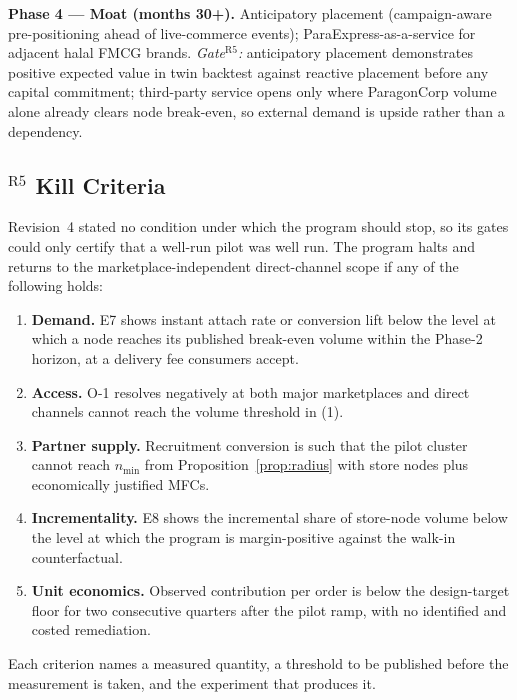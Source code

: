 \textbf{Phase 4 --- Moat (months 30+).} Anticipatory placement (campaign-aware pre-positioning ahead of live-commerce events); ParaExpress-as-a-service for adjacent halal FMCG brands.
\emph{Gate}$^{\mathrm{R5}}$\emph{:} anticipatory placement demonstrates positive expected value in twin backtest against reactive placement before any capital commitment; third-party service opens only where ParagonCorp volume alone already clears node break-even, so external demand is upside rather than a dependency.

\subsection{$^{\mathrm{R5}}$ Kill Criteria}
Revision~4 stated no condition under which the program should stop, so its gates could only certify that a well-run pilot was well run. The program halts and returns to the marketplace-independent direct-channel scope if any of the following holds:

\begin{enumerate}
\item \textbf{Demand.} E7 shows instant attach rate or conversion lift below the level at which a node reaches its published break-even volume within the Phase-2 horizon, at a delivery fee consumers accept.
\item \textbf{Access.} O-1 resolves negatively at both major marketplaces and direct channels cannot reach the volume threshold in (1).
\item \textbf{Partner supply.} Recruitment conversion is such that the pilot cluster cannot reach $n_{\min}$ from Proposition~\ref{prop:radius} with store nodes plus economically justified MFCs.
\item \textbf{Incrementality.} E8 shows the incremental share of store-node volume below the level at which the program is margin-positive against the walk-in counterfactual.
\item \textbf{Unit economics.} Observed contribution per order is below the design-target floor for two consecutive quarters after the pilot ramp, with no identified and costed remediation.
\end{enumerate}

Each criterion names a measured quantity, a threshold to be published before the measurement is taken, and the experiment that produces it. 

